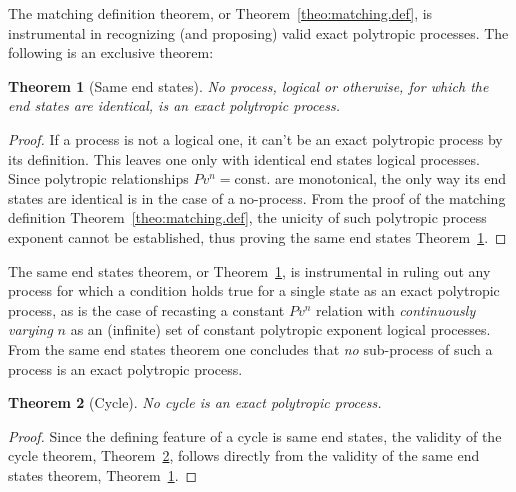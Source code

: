 \documentclass[fleqn,10pt]{SelfArx}
\newtheorem{theorem}{Theorem}
\begin{document}
    The matching definition theorem, or Theorem~\ref{theo:matching.def}, is instrumental in
    recognizing (and proposing) valid exact polytropic processes. The following is an exclusive
    theorem:

    \begin{theorem}[Same end states]\label{theo:same.end.states}
        No process, logical or otherwise, for which the end states are identical, is an exact
        polytropic process.
    \end{theorem}

    \begin{proof}
        If a process is not a logical one, it can't  be  an  exact  polytropic  process  by  its
        definition. This leaves one only with identical  end  states  logical  processes.  Since
        polytropic relationships $Pv^n = \mbox{const.}$ are monotonical, the only  way  its  end
        states are identical is in the case of a no-process. From  the  proof  of  the  matching
        definition Theorem~\ref{theo:matching.def},  the  unicity  of  such  polytropic  process
        exponent   cannot   be   established,    thus    proving    the    same    end    states
        Theorem~\ref{theo:same.end.states}.
    \end{proof}

    The same end states  theorem,  or  Theorem~\ref{theo:same.end.states},  is  instrumental  in
    ruling out any process for which a condition holds true for  a  single  state  as  an  exact
    polytropic  process,  as  is  the  case  of  recasting  a  constant  $Pv^n$  relation   with
    \emph{continuously varying} $n$ as an (infinite) set of constant polytropic exponent logical
    processes. From the same end states theorem one concludes that \emph{no} sub-process of such
    a process is an exact polytropic process.

    \begin{theorem}[Cycle]\label{theo:cycle}
        No cycle is an exact polytropic process.
    \end{theorem}

    \begin{proof}
        Since the defining feature of a cycle is same end states,  the  validity  of  the  cycle
        theorem, Theorem~\ref{theo:cycle}, follows directly from the validity of  the  same  end
        states theorem, Theorem~\ref{theo:same.end.states}.
    \end{proof}

\end{document}
